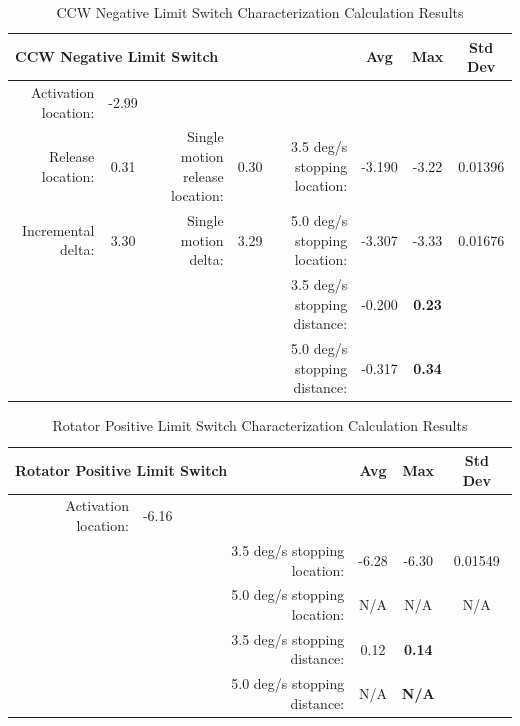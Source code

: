 \documentclass[SE,lsstdraft,authoryear,toc]{lsstdoc}
\begin{document}
\begin{landscape}
\begin{table}[h!]
  \begin{center}
    \caption{CCW Negative Limit Switch Characterization Calculation Results}
    \label{tab:table2}
    \begin{tabular}{r|c|r|c|r|c|c|c}
    \multicolumn{5}{l|}{\textbf{CCW Negative Limit Switch}} & Avg & Max & Std Dev\\
    \midrule
    Activation location: & -2.99 & & & & & & \\
    Release location: & 0.31 & Single motion release location: & 0.30 & 3.5
    deg/s stopping location: & -3.190 & -3.22 & 0.01396 \\
    Incremental delta: & 3.30 & Single motion delta: & 3.29 & 5.0 deg/s
    stopping location: & -3.307 & -3.33 & 0.01676 \\
    & & & & 3.5 deg/s stopping distance: & -0.200 & \textbf{ 0.23} & \\
    & & & & 5.0 deg/s stopping distance: & -0.317 & \textbf{ 0.34} & \\
    \end{tabular}
  \end{center}
\end{table}

\begin{table}[h!]
  \begin{center}
    \caption{Rotator Positive Limit Switch Characterization Calculation Results}
    \label{tab:table3}
    \begin{tabular}{r|c|r|c|c|c}
    \multicolumn{3}{l|}{\textbf{Rotator Positive Limit Switch}} & Avg & Max & Std Dev\\
    \midrule
    Activation location: & -6.16 & & & & \\
    & & 3.5 deg/s stopping location: & -6.28 & -6.30 & 0.01549 \\
    & & 5.0 deg/s stopping location: & N/A & N/A & N/A \\
    & & 3.5 deg/s stopping distance: &  0.12 & \textbf{ 0.14} & \\
    & & 5.0 deg/s stopping distance: & N/A & \textbf{N/A} & \\
    \end{tabular}
  \end{center}
\end{table}


\end{landscape}
\end{document}
